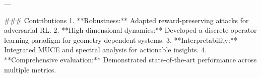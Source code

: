---

### Contributions  
1. **Robustness:** Adapted reward-preserving attacks for adversarial RL.  
2. **High-dimensional dynamics:** Developed a discrete operator learning paradigm for geometry-dependent systems.  
3. **Interpretability:** Integrated MUCE and spectral analysis for actionable insights.  
4. **Comprehensive evaluation:** Demonstrated state-of-the-art performance across multiple metrics.  

